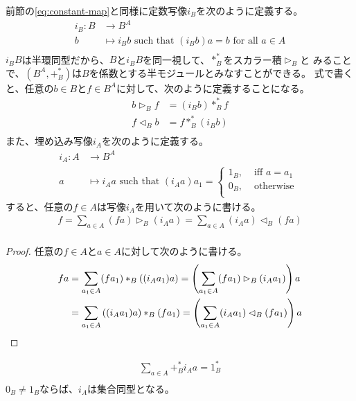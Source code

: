 前節の\eqref{eq:constant-map}と同様に定数写像$i_B$を次のように定義する。
\begin{equation}\begin{split} %
	i_B: B &\to B^A \\
		b &\mapsto i_Bb \text{ such that } (i_Bb)a = b \text{ for all }a\in A \\
\end{split}\end{equation} %
$i_BB$は半環同型だから、$B$と$i_BB$を同一視して、$*_B^*$をスカラー積$\rhd_B$と
みることで、$(B^A,+_B^*)$は$B$を係数とする半モジュールとみなすことができる。
式で書くと、任意の$b\in B$と$f\in B^A$に対して、次のように定義することになる。
\begin{equation*}\begin{split} %
	b\rhd_B f &= (i_Bb) *_B^* f \\
	f\lhd_B b &= f *_B^* (i_Bb) \\
\end{split}\end{equation*} %
また、埋め込み写像$i_A$を次のように定義する。
\begin{equation}\begin{split} %
	i_A: A &\to B^A \\
		a &\mapsto i_Aa \text{ such that } (i_Aa)a_1 = \begin{cases}
			1_B, &\text{ iff }a = a_1 \\
			0_B, &\text{ otherwise } \\
		\end{cases}
\end{split}\end{equation} %
すると、任意の$f\in A$は写像$i_A$を用いて次のように書ける。
\begin{equation}\begin{split} %
	f = \sum_{a\in A} (fa)\rhd_B (i_Aa) = \sum_{a\in A} (i_Aa)\lhd_B (fa) \\
\end{split}\end{equation} %
\begin{proof} %
任意の$f\in A$と$a\in A$に対して次のように書ける。
\begin{equation*}\begin{split} %
	fa &= \sum_{a_1\in A} (fa_1) *_B \kakko{(i_Aa_1)a}
		= \kakko{\sum_{a_1\in A} (fa_1)\rhd_B (i_Aa_1)}a \\
		&= \sum_{a_1\in A} \kakko{(i_Aa_1)a} *_B (fa_1)
		= \kakko{\sum_{a_1\in A} (i_Aa_1)\lhd_B (fa_1)}a \\
\end{split}\end{equation*} %
\end{proof} %
\begin{equation}\begin{split} %
	\sum_{a\in A}+_B^*i_Aa = 1_B^* \\
\end{split}\end{equation} %
$0_B\neq 1_B$ならば、$i_A$は集合同型となる。

